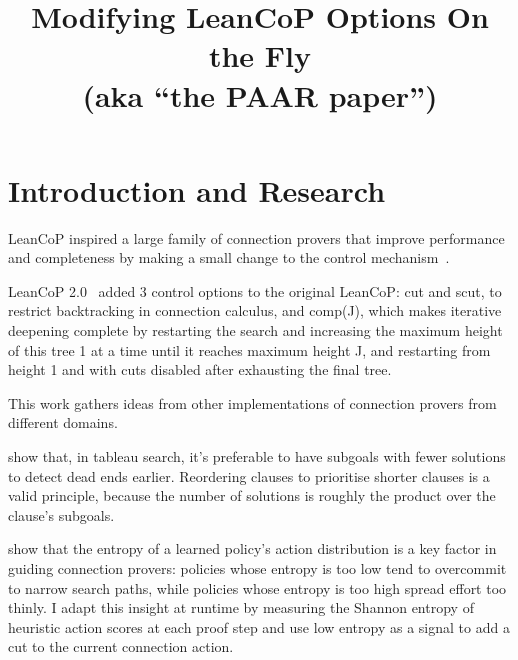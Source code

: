 \documentclass[11pt,twocolumn]{article}
\title{Modifying LeanCoP Options On the Fly \\[3pt] \large (aka ``the PAAR paper'')}
\date{}
\author{}
\newcommand{\atom}[1]{\colorbox{Gray!30}{\ttfamily #1}}
\newcommand{\citen}[1]{~\parencite{#1}}
\newcommand{\citeay}[1]{\textcite{#1}}
\begin{document}
\twocolumn[
	\centering
	\vspace{1em}
	{\LARGE An improved schedule for LeanCoP options \par} \vspace{3pt}
	{\large (aka ``the PAAR and/or AITP paper'') \par}
	\vspace{2em}
]

\section{Introduction and Research}

LeanCoP inspired a large family of connection provers that improve performance and completeness by making a small change to the control mechanism\citen{Otten2023leanCoP20}.

LeanCoP 2.0\citen{ottenLeanCoP20} added 3 control options to the original LeanCoP: \atom{cut} and \atom{scut}, to restrict backtracking in connection calculus, and \atom{comp(J)}, which makes iterative deepening complete by restarting the search and increasing the maximum height of this tree 1 at a time until it reaches maximum height \atom{J}, and restarting from height 1 and with cuts disabled after exhausting the final tree.

This work gathers ideas from other implementations of connection provers from different domains.

\citeay{letzModelEliminationConnection2001} show that, in tableau search, it's preferable to have subgoals with fewer solutions to detect dead ends earlier.
Reordering clauses to prioritise shorter clauses is a valid principle, because the number of solutions is roughly the product over the clause's subgoals.


\citeay{zomboriRoleEntropyGuiding2021} show that the entropy of a learned policy's action distribution is a key factor in guiding connection provers: policies whose entropy is too low tend to overcommit to narrow search paths, while policies whose entropy is too high spread effort too thinly.
I adapt this insight at runtime by measuring the Shannon entropy of heuristic action scores at each proof step and use low entropy as a signal to add a \atom{cut} to the current connection action.
\end{document}
